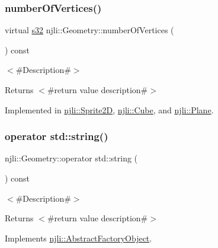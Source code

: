 \subsubsection{\texorpdfstring{number\+Of\+Vertices()}{numberOfVertices()}}
{\footnotesize\ttfamily virtual \mbox{\hyperlink{_util_8h_aa62c75d314a0d1f37f79c4b73b2292e2}{s32}} njli\+::\+Geometry\+::number\+Of\+Vertices (\begin{DoxyParamCaption}{ }\end{DoxyParamCaption}) const\hspace{0.3cm}{\ttfamily [pure virtual]}}

$<$\#\+Description\#$>$

\begin{DoxyReturn}{Returns}
$<$\#return value description\#$>$ 
\end{DoxyReturn}


Implemented in \mbox{\hyperlink{classnjli_1_1_sprite2_d_ae13602610a36e2636c0416a500847dc7}{njli\+::\+Sprite2D}}, \mbox{\hyperlink{classnjli_1_1_cube_aadf462166716a9545b1b2b47078064e7}{njli\+::\+Cube}}, and \mbox{\hyperlink{classnjli_1_1_plane_a5e69f210a364b0fbacb0e06d98e41725}{njli\+::\+Plane}}.

\mbox{\label{classnjli_1_1_geometry_ae678ad91efebe665fc2f5533dc26fe24}} 
\subsubsection{\texorpdfstring{operator std\+::string()}{operator std::string()}}
{\footnotesize\ttfamily njli\+::\+Geometry\+::operator std\+::string (\begin{DoxyParamCaption}{ }\end{DoxyParamCaption}) const\hspace{0.3cm}{\ttfamily [virtual]}}

$<$\#\+Description\#$>$

\begin{DoxyReturn}{Returns}
$<$\#return value description\#$>$ 
\end{DoxyReturn}


Implements \mbox{\hyperlink{classnjli_1_1_abstract_factory_object_a838f4fa7e65cace6098aab5222892942}{njli\+::\+Abstract\+Factory\+Object}}.



